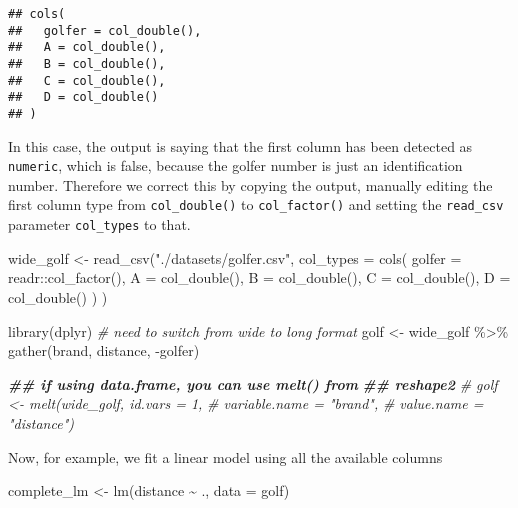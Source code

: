 \documentclass[
  oneside]{book}
\newenvironment{Shaded}{\begin{snugshade}}{\end{snugshade}}
\newcommand{\AttributeTok}[1]{\textcolor[rgb]{0.77,0.63,0.00}{#1}}
\newcommand{\CommentTok}[1]{\textcolor[rgb]{0.56,0.35,0.01}{\textit{#1}}}
\newcommand{\DocumentationTok}[1]{\textcolor[rgb]{0.56,0.35,0.01}{\textbf{\textit{#1}}}}
\newcommand{\FunctionTok}[1]{\textcolor[rgb]{0.00,0.00,0.00}{#1}}
\newcommand{\NormalTok}[1]{#1}
\newcommand{\OtherTok}[1]{\textcolor[rgb]{0.56,0.35,0.01}{#1}}
\newcommand{\SpecialCharTok}[1]{\textcolor[rgb]{0.00,0.00,0.00}{#1}}
\newcommand{\StringTok}[1]{\textcolor[rgb]{0.31,0.60,0.02}{#1}}
\begin{document}
\begin{verbatim}
## cols(
##   golfer = col_double(),
##   A = col_double(),
##   B = col_double(),
##   C = col_double(),
##   D = col_double()
## )
\end{verbatim}

In this case, the output is saying that the first column has
been detected as \texttt{numeric}, which is false, because the golfer
number is just an identification number.
Therefore we correct this by copying the output, manually editing
the first column type from \texttt{col\_double()} to \texttt{col\_factor()} and
setting the \texttt{read\_csv} parameter \texttt{col\_types} to that.

\begin{Shaded}
\begin{Highlighting}[]
\NormalTok{wide\_golf }\OtherTok{\textless{}{-}} \FunctionTok{read\_csv}\NormalTok{(}\StringTok{"./datasets/golfer.csv"}\NormalTok{,}
  \AttributeTok{col\_types =} \FunctionTok{cols}\NormalTok{(}
    \AttributeTok{golfer =}\NormalTok{ readr}\SpecialCharTok{::}\FunctionTok{col\_factor}\NormalTok{(),}
    \AttributeTok{A =} \FunctionTok{col\_double}\NormalTok{(),}
    \AttributeTok{B =} \FunctionTok{col\_double}\NormalTok{(),}
    \AttributeTok{C =} \FunctionTok{col\_double}\NormalTok{(),}
    \AttributeTok{D =} \FunctionTok{col\_double}\NormalTok{()}
\NormalTok{  )}
\NormalTok{)}

\FunctionTok{library}\NormalTok{(dplyr)}
\CommentTok{\# need to switch from wide to long format}
\NormalTok{golf }\OtherTok{\textless{}{-}}\NormalTok{ wide\_golf }\SpecialCharTok{\%\textgreater{}\%}
  \FunctionTok{gather}\NormalTok{(brand, distance, }\SpecialCharTok{{-}}\NormalTok{golfer)}

\DocumentationTok{\#\# if using data.frame, you can use \textasciigrave{}melt()\textasciigrave{} from}
\DocumentationTok{\#\# reshape2}
\CommentTok{\# golf \textless{}{-} melt(wide\_golf, id.vars = 1,}
\CommentTok{\#             variable.name = "brand",}
\CommentTok{\#             value.name = "distance")}
\end{Highlighting}
\end{Shaded}

Now, for example, we fit a linear model using all the
available columns

\begin{Shaded}
\begin{Highlighting}[]
\NormalTok{complete\_lm }\OtherTok{\textless{}{-}} \FunctionTok{lm}\NormalTok{(distance }\SpecialCharTok{\textasciitilde{}}\NormalTok{ ., }\AttributeTok{data =}\NormalTok{ golf)}
\end{Highlighting}
\end{Shaded}
\end{document}
